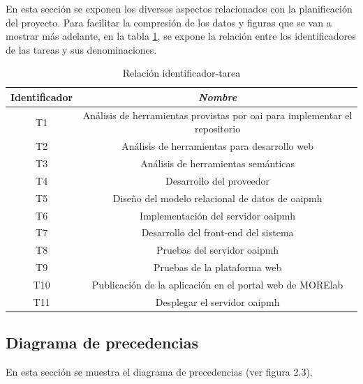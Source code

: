 En esta sección se exponen los diversos aspectos relacionados con la planificación del proyecto. Para facilitar la compresión de los datos y figuras que se van a mostrar más adelante, en la tabla \ref{tab:task_id_name}, se expone la relación entre los identificadores de las tareas y sus denominaciones.

\begin{table}[htp]
	\centering
	\caption{Relación identificador-tarea}\label{tab:task_id_name}
	\begin{tabular}{cc}
		\toprule
    	\textbf{Identificador} & \emph{Nombre}\\
    	\midrule
    	T1 & Análisis de herramientas provistas por \acrshort{oai} para implementar el repositorio\\
    	T2 & Análisis de herramientas para desarrollo web\\
    	T3 & Análisis de herramientas semánticas\\
    	T4 & Desarrollo del proveedor\\
    	T5 & Diseño del modelo relacional de datos de \acrshort{oaipmh}\\
    	T6 & Implementación del servidor \acrshort{oaipmh}\\
    	T7 & Desarrollo del front-end del sistema\\
    	T8 & Pruebas del servidor \acrshort{oaipmh}\\
    	T9 & Pruebas de la plataforma web\\
    	T10 & Publicación de la aplicación en el portal web de MORElab\\
    	T11 & Desplegar el servidor \acrshort{oaipmh}\\
    	\bottomrule
    \end{tabular}
\end{table}

\subsection{Diagrama de precedencias}

En esta sección se muestra el diagrama de precedencias (ver figura 2.3).

